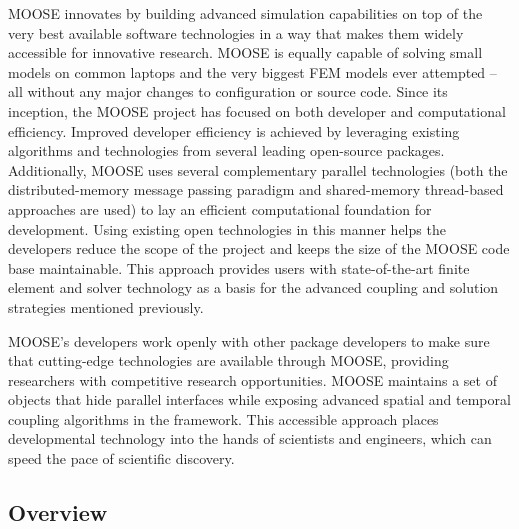 \documentclass{INLreport}
\begin{document}
MOOSE innovates by building advanced simulation capabilities on top of the very best available software technologies in a way that
makes them widely accessible for innovative research. MOOSE is equally capable of solving small models on common laptops and
the very biggest FEM models ever attempted -- all without any major changes to configuration or source code. Since its
inception, the MOOSE project has focused on both developer and computational efficiency. Improved developer efficiency is
achieved by leveraging existing algorithms and technologies from several leading open-source packages. Additionally, MOOSE uses
several complementary parallel technologies (both the distributed-memory message passing paradigm and shared-memory thread-based
approaches are used) to lay an efficient computational foundation for development. Using existing open technologies in this
manner helps the developers reduce the scope of the project and keeps the size of the MOOSE code base maintainable. This approach
provides users with state-of-the-art finite element and solver technology as a basis for the advanced coupling and solution
strategies mentioned previously.

MOOSE’s developers work openly with other package developers to make sure that cutting-edge
technologies are available through MOOSE, providing researchers with competitive research opportunities. MOOSE maintains a set
of objects that hide parallel interfaces while exposing advanced spatial and temporal coupling algorithms in the framework.
This accessible approach places developmental technology into the hands of scientists and engineers, which can speed the pace of
scientific discovery.

\subsection{Overview}
\end{document}
